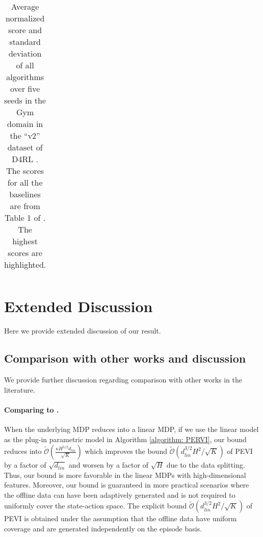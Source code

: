 \documentclass{article} \usepackage{iclr2023/iclr2023_conference,times}
\begin{document}
\begin{table}[]
{\begin{tabular}{lllllllll}
    \end{tabular}
    }
    \caption{{Average normalized score and standard deviation of all algorithms over five seeds in the Gym domain in the ``v2'' dataset of D4RL \citep{DBLP:journals/corr/abs-2004-07219}. The scores for all the baselines are from Table 1 of \cite{bai2022pessimistic}. The highest scores are highlighted.}}
    \label{tab: d4rl result}
\end{table}
\color{black} \section{Extended Discussion}
\label{section: extended discussion}
Here we provide extended discussion of our result. 
\subsection{Comparison with other works and discussion}
\label{subsection: comparison with other works in details}

We provide further discussion regarding comparison with other works in the literature.  
\paragraph{Comparing to \cite{jin2021pessimism}.}
When the underlying MDP reduces into a linear MDP, if we use the linear model as the plug-in parametric model in Algorithm \ref{algorithm: PERVI},  our bound reduces into $\tilde{\mathcal{O}}\left(  \frac{\kappa H^{5/2}  d_{lin} }{\sqrt{K}} \right)$ which improves the bound $\tilde{\mathcal{O}}(d^{3/2}_{lin} H^2 / \sqrt{K})$ of PEVI \citep[Corollary~4.6]{jin2021pessimism} by a factor of $\sqrt{d_{lin}}$ and worsen by a factor of $\sqrt{H}$ due to the data splitting. Thus, our bound is more favorable in the linear MDPs with high-dimensional features. Moreover, our bound is guaranteed in more practical scenarios where the offline data can have been adaptively generated and is not required to uniformly cover the state-action space. The explicit bound $\tilde{\mathcal{O}}(d^{3/2}_{lin} H^2 / \sqrt{K})$ of PEVI \citep[Corollary~4.6]{jin2021pessimism} is obtained under the assumption that the offline data have uniform coverage and are generated independently on the episode basis. 
\end{document}
